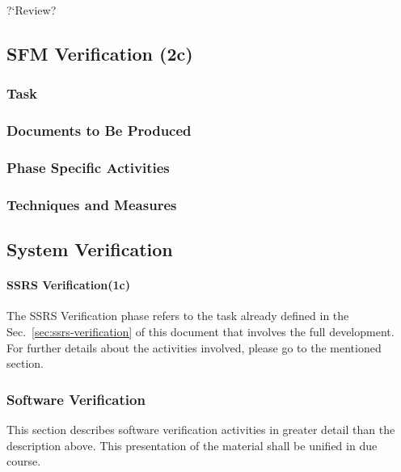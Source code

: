 \documentclass{template/openetcs_report}
\newcommand{\qq}[1]{?`#1?}
\begin{document}
\qq{Review}



\subsection{SFM Verification (2c)}
\label{sec:sfm-verif-verification}

\subsubsection{Task}
\label{sec:sfm-verif-task}

\subsubsection{Documents to Be Produced}
\label{sec:sfm-verif-docum-be-prod}

\subsubsection{Phase Specific Activities}
\label{sec:sfm-verif-phase-spec-activ}

\subsubsection{Techniques and Measures}
\label{sec:sfm-verif-techniques-measures}





\subsection{System Verification}

\paragraph{SSRS Verification(1c)}
The SSRS Verification phase refers to the task already defined in the
Sec.~\ref{sec:ssrs-verification} of this document that involves the
full development.  For further details about the activities involved,
please go to the mentioned section.

\subsubsection{Software Verification}
\label{sec:sw-verif}

This section describes software verification activities in greater detail than the description above. This presentation of the material shall be unified in due course.
\end{document}
